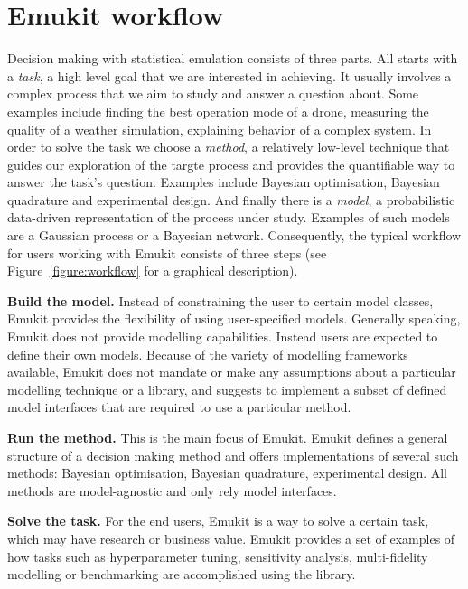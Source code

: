\section{Emukit workflow}\label{sec:workflow}
Decision making with statistical emulation consists of three parts. All starts with a \textit{task}, a high level goal that we are interested in achieving. It usually involves a complex process that we aim to study and answer a question about. Some examples include finding the best operation mode of a drone, measuring the quality of a weather simulation, explaining behavior of a complex system. In order to solve the task we choose a \textit{method}, a relatively low-level technique that guides our exploration of the targte process and provides the quantifiable way to answer the task's question. Examples include Bayesian optimisation, Bayesian quadrature and experimental design. And finally there is a \textit{model}, a probabilistic data-driven representation of the process under study. Examples of such models are a Gaussian process or a Bayesian network. Consequently, the typical workflow for users working with Emukit consists of three steps (see Figure~\ref{figure:workflow} for a graphical description).

\textbf{Build the model.} Instead of constraining the user to certain model classes, Emukit provides the flexibility of using user-specified models. Generally speaking, Emukit does not provide modelling capabilities. Instead users are expected to define their own models. Because of the variety of modelling frameworks available, Emukit does not mandate or make any assumptions about a particular modelling technique or a library, and suggests to implement a subset of defined model interfaces that are required to use a particular method.

\textbf{Run the method.} This is the main focus of Emukit. Emukit defines a general structure of a decision making method and offers implementations of several such methods: Bayesian optimisation, Bayesian quadrature, experimental design. All methods are model-agnostic and only rely model interfaces.

\textbf{Solve the task.} For the end users, Emukit is a way to solve a certain task, which may have research or business value. Emukit provides a set of examples of how tasks such as hyperparameter tuning, sensitivity analysis, multi-fidelity modelling or benchmarking are accomplished using the library.

